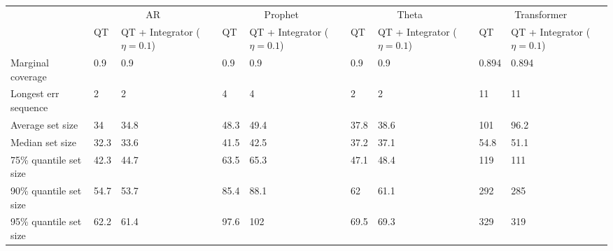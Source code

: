 \begin{tabular}{lllllllll}
\toprule
& \multicolumn{2}{c}{AR}& \multicolumn{2}{c}{Prophet}& \multicolumn{2}{c}{Theta}& \multicolumn{2}{c}{Transformer} \\
& QT & QT + Integrator ($\eta=0.1$) & QT & QT + Integrator ($\eta=0.1$) & QT & QT + Integrator ($\eta=0.1$) & QT & QT + Integrator ($\eta=0.1$) \\
\midrule
Marginal coverage & 0.9 & 0.9 & 0.9 & 0.9 & 0.9 & 0.9 & 0.894 & 0.894 \\
Longest err sequence & 2 & 2 & 4 & 4 & 2 & 2 & 11 & 11 \\
Average set size & 34 & 34.8 & 48.3 & 49.4 & 37.8 & 38.6 & 101 & 96.2 \\
Median set size & 32.3 & 33.6 & 41.5 & 42.5 & 37.2 & 37.1 & 54.8 & 51.1 \\
75\% quantile set size & 42.3 & 44.7 & 63.5 & 65.3 & 47.1 & 48.4 & 119 & 111 \\
90\% quantile set size & 54.7 & 53.7 & 85.4 & 88.1 & 62 & 61.1 & 292 & 285 \\
95\% quantile set size & 62.2 & 61.4 & 97.6 & 102 & 69.5 & 69.3 & 329 & 319 \\
\bottomrule
\end{tabular}

